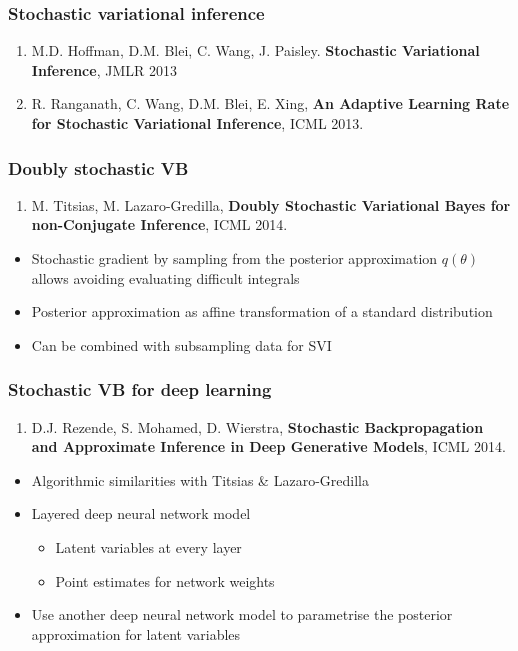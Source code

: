 \documentclass{beamer}
\newcommand{\parameters}{\theta}
\begin{document}
\begin{frame}
  \frametitle{Stochastic variational inference}

  \begin{enumerate}
  \item M.D. Hoffman, D.M. Blei, C. Wang, J. Paisley. \textbf{Stochastic Variational Inference}, JMLR 2013
  \item R. Ranganath, C. Wang, D.M. Blei, E. Xing, \textbf{An Adaptive Learning Rate for Stochastic Variational Inference}, ICML 2013.
  \end{enumerate}
\end{frame}

\begin{frame}
  \frametitle{Doubly stochastic VB}

  \begin{enumerate}
  \item M. Titsias, M. Lazaro-Gredilla, \textbf{Doubly Stochastic Variational Bayes for non-Conjugate Inference}, ICML 2014.
  \end{enumerate}

  \begin{itemize}
  \item Stochastic gradient by sampling from the posterior
    approximation $q(\parameters)$ allows avoiding evaluating difficult
    integrals
  \item Posterior approximation as affine transformation of a standard
    distribution
  \item Can be combined with subsampling data for SVI
  \end{itemize}
\end{frame}

\begin{frame}
  \frametitle{Stochastic VB for deep learning}

  \begin{enumerate}
  \item D.J. Rezende, S. Mohamed, D. Wierstra, \textbf{Stochastic Backpropagation and Approximate Inference in Deep Generative Models}, ICML 2014.
  \end{enumerate}

  \begin{itemize}
  \item Algorithmic similarities with Titsias \& Lazaro-Gredilla
  \item Layered deep neural network model
    \begin{itemize}
    \item Latent variables at every layer
    \item Point estimates for network weights
    \end{itemize}
  \item Use another deep neural network model to parametrise
    the posterior approximation for latent variables
  \end{itemize}
\end{frame}
\end{document}
